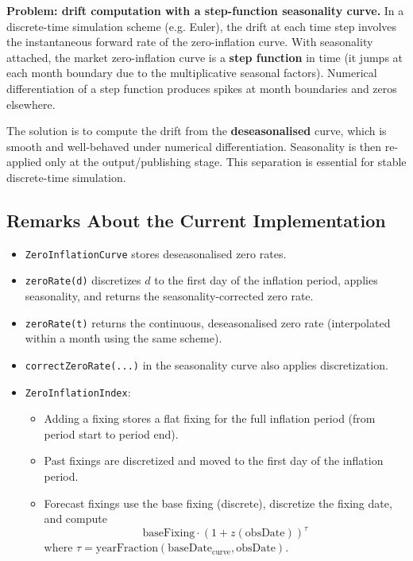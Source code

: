 \documentclass[11pt,a4paper]{article}
\newcommand{\code}[1]{\texttt{#1}}
\begin{document}
\textbf{Problem: drift computation with a step-function seasonality curve.} In a discrete-time simulation scheme (e.g. Euler), the drift at each time step involves the instantaneous forward rate of the zero-inflation curve. With seasonality attached, the market zero-inflation curve is a \textbf{step function} in time (it jumps at each month boundary due to the multiplicative seasonal factors). Numerical differentiation of a step function produces spikes at month boundaries and zeros elsewhere.

The solution is to compute the drift from the \textbf{deseasonalised} curve, which is smooth and well-behaved under numerical differentiation. Seasonality is then re-applied only at the output/publishing stage. This separation is essential for stable discrete-time simulation.

\subsection{Remarks About the Current Implementation}

\begin{itemize}[leftmargin=*]
\item \code{ZeroInflationCurve} stores deseasonalised zero rates.
\item \code{zeroRate(d)} discretizes $d$ to the first day of the inflation period, applies seasonality, and returns the seasonality-corrected zero rate.
\item \code{zeroRate(t)} returns the continuous, deseasonalised zero rate (interpolated within a month using the same scheme).
\item \code{correctZeroRate(...)} in the seasonality curve also applies discretization.
\item \code{ZeroInflationIndex}:
  \begin{itemize}
  \item Adding a fixing stores a flat fixing for the full inflation period (from period start to period end).
  \item Past fixings are discretized and moved to the first day of the inflation period.
  \item Forecast fixings use the base fixing (discrete), discretize the fixing date, and compute
    \begin{equation}
    \text{baseFixing} \cdot (1 + z(\text{obsDate}))^{\tau}
    \end{equation}
    where $\tau = \text{yearFraction}(\text{baseDate}_\text{curve}, \text{obsDate})$.
  \end{itemize}
\end{itemize}
\end{document}
